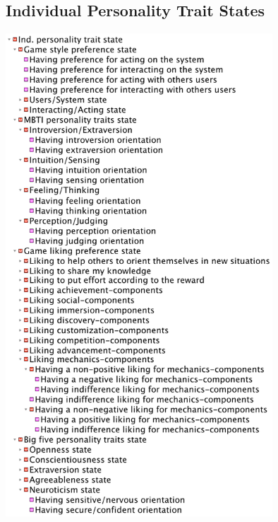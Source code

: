 \subsection{Individual Personality Trait States}
\includegraphics[width=0.75\textwidth]{images/appendix/tree-overview-ind-personality-trait-states.png}

\newpage

